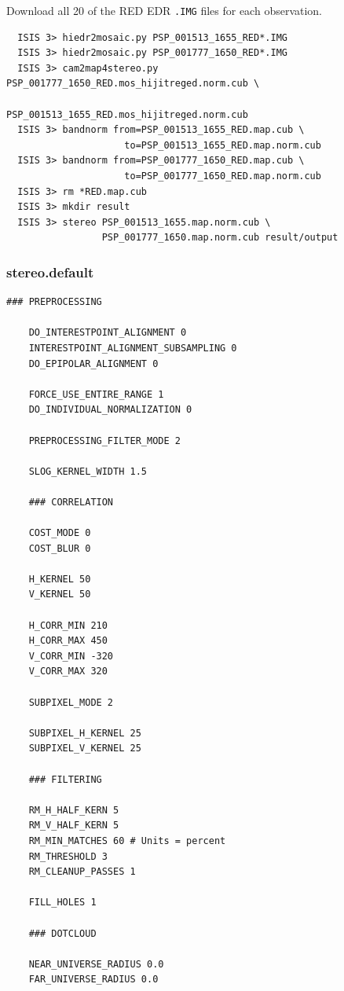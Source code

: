 Download all 20 of the RED EDR \texttt{.IMG} files for each observation.
\begin{verbatim}
  ISIS 3> hiedr2mosaic.py PSP_001513_1655_RED*.IMG
  ISIS 3> hiedr2mosaic.py PSP_001777_1650_RED*.IMG
  ISIS 3> cam2map4stereo.py PSP_001777_1650_RED.mos_hijitreged.norm.cub \
                            PSP_001513_1655_RED.mos_hijitreged.norm.cub
  ISIS 3> bandnorm from=PSP_001513_1655_RED.map.cub \
                     to=PSP_001513_1655_RED.map.norm.cub
  ISIS 3> bandnorm from=PSP_001777_1650_RED.map.cub \
                     to=PSP_001777_1650_RED.map.norm.cub
  ISIS 3> rm *RED.map.cub
  ISIS 3> mkdir result
  ISIS 3> stereo PSP_001513_1655.map.norm.cub \
                 PSP_001777_1650.map.norm.cub result/output
\end{verbatim}

\clearpage

\subsubsection*{stereo.default}

\begin{center}\begin{minipage}{5.5in}
\begin{Verbatim}[frame=single,fontsize=\small,label=stereo.default for HiRISE Columbia Hills]
    ### PREPROCESSING

    DO_INTERESTPOINT_ALIGNMENT 0
    INTERESTPOINT_ALIGNMENT_SUBSAMPLING 0
    DO_EPIPOLAR_ALIGNMENT 0

    FORCE_USE_ENTIRE_RANGE 1
    DO_INDIVIDUAL_NORMALIZATION 0

    PREPROCESSING_FILTER_MODE 2

    SLOG_KERNEL_WIDTH 1.5

    ### CORRELATION

    COST_MODE 0
    COST_BLUR 0

    H_KERNEL 50
    V_KERNEL 50

    H_CORR_MIN 210
    H_CORR_MAX 450
    V_CORR_MIN -320
    V_CORR_MAX 320

    SUBPIXEL_MODE 2

    SUBPIXEL_H_KERNEL 25
    SUBPIXEL_V_KERNEL 25

    ### FILTERING

    RM_H_HALF_KERN 5
    RM_V_HALF_KERN 5
    RM_MIN_MATCHES 60 # Units = percent
    RM_THRESHOLD 3
    RM_CLEANUP_PASSES 1

    FILL_HOLES 1

    ### DOTCLOUD

    NEAR_UNIVERSE_RADIUS 0.0
    FAR_UNIVERSE_RADIUS 0.0
\end{Verbatim}
\end{minipage}\end{center}

